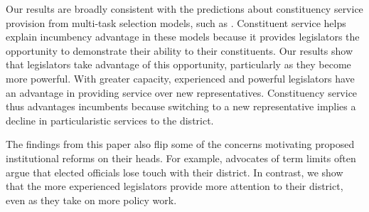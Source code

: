 \documentclass[12pt]{article}
\begin{document}

Our results are broadly consistent with the predictions about constituency service provision from multi-task selection models, such as \cite{AshworthBuenodeMesquita2006}. Constituent service helps explain incumbency advantage in these models because it provides legislators the opportunity to demonstrate their ability to their constituents. Our results show that legislators take advantage of this opportunity, particularly as they become more powerful. With greater capacity, experienced and powerful legislators have an advantage in providing service over new representatives. Constituency service thus advantages incumbents because switching to a new representative implies a decline in particularistic services to the district. 

The findings from this paper also flip some of the concerns motivating proposed institutional reforms on their heads. For example, advocates of term limits often argue that elected officials lose touch with their district. In contrast, we show that the more experienced legislators provide more attention to their district, even as they take on more policy work.  

\end{document}
